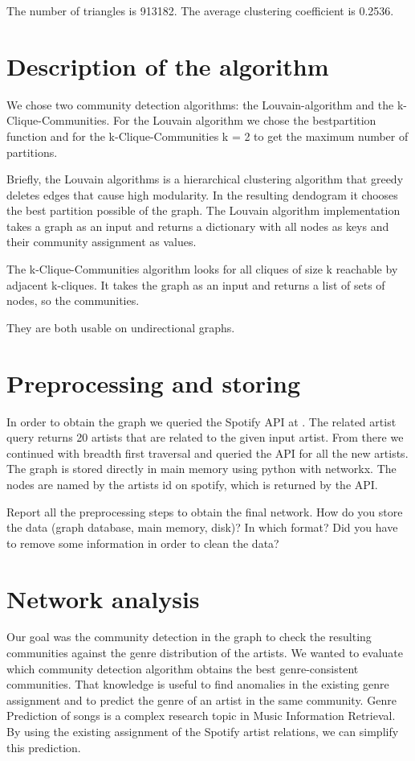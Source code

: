 \documentclass[11pt,a4paper,onecolumn,notitlepage]{article}
\begin{document}
The number of triangles is 913182. The average clustering coefficient is 0.2536.

\section{Description of the algorithm}

We chose two community detection algorithms: the Louvain-algorithm\cite{louvain} and the k-Clique-Communities\cite{kclique}. For the Louvain algorithm we chose the bestpartition function and for the k-Clique-Communities k = 2 to get the maximum number of partitions.

Briefly, the Louvain algorithms is a hierarchical clustering algorithm that greedy deletes edges that cause high modularity. In the resulting dendogram it chooses the best partition possible of the graph. The Louvain algorithm implementation takes a graph as an input and returns a dictionary with all nodes as keys and their community assignment as values. 

The k-Clique-Communities algorithm looks for all cliques of size k reachable by adjacent k-cliques. It takes the graph as an input and returns a list of sets of nodes, so the communities.

They are both usable on undirectional graphs.

\section{Preprocessing and storing}

In order to obtain the graph we queried the Spotify API at \cite{spotifyapi}. The related artist query returns 20 artists that are related to the given input artist.
From there we continued with breadth first traversal and queried the API for all the new artists. The graph is stored directly in main memory using python with networkx.
The nodes are named by the artists id on spotify, which is returned by the API.

Report all the preprocessing steps to obtain the final network. How do you store the data (graph database, main memory, disk)? In which format? Did you have to remove some information in order to clean the data? 

\section{Network analysis}
Our goal was the community detection in the graph to check the resulting communities against the genre distribution of the artists. We wanted to evaluate which community detection algorithm obtains the best genre-consistent communities. That knowledge is useful to find anomalies in the existing genre assignment and to predict the genre of an artist in the same community. Genre Prediction of songs is a complex research topic in Music Information Retrieval. By using the existing assignment of the Spotify artist relations, we can simplify this prediction.
\end{document}
